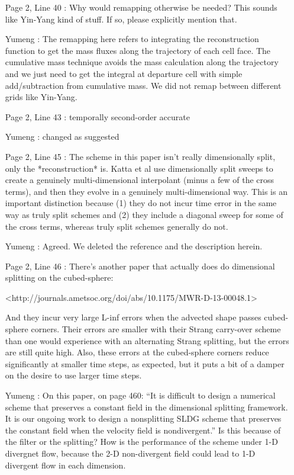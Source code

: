 \documentclass[12pt]{article}
\begin{document}
\begin{enumerate}
\item [Page 2, Line 40]: Why would remapping otherwise be needed? This sounds like Yin-Yang kind of stuff. If so, please explicitly mention that.

\item [Yumeng]:  The remapping here refers to integrating the reconstruction function to get the mass fluxes along the trajectory of each cell face. The cumulative mass technique \citep{CW84,LLM95} avoids the mass calculation along the trajectory and we just need to get the integral at departure cell with simple add/subtraction from cumulative mass. We did not remap between different grids like Yin-Yang.

\item [Page 2, Line 43]: temporally second-order accurate

\item [Yumeng]: changed as suggested

\item [Page 2, Line 45]: The scheme in this paper isn't really dimensionally split, only the *reconstruction* is. Katta et al use dimensionally split sweeps to create a genuinely multi-dimensional interpolant (minus a few of the cross terms), and then they evolve in a genuinely multi-dimensional way. This is an important distinction because (1) they do not incur time error in the same way as truly split schemes and (2) they include a diagonal sweep for some of the cross terms, whereas truly split schemes generally do not.

\item [Yumeng]: Agreed. We deleted the reference and the description herein.


\item [Page 2, Line 46]: There's another paper that actually does do dimensional splitting on the cubed-sphere:

<http://journals.ametsoc.org/doi/abs/10.1175/MWR-D-13-00048.1>

And they incur very large L-inf errors when the advected shape passes cubed-sphere corners. Their errors are smaller with their Strang carry-over scheme than one would experience with an alternating Strang splitting, but the errors are still quite high. Also, these errors at the cubed-sphere corners reduce significantly at smaller time steps, as expected, but it puts a bit of a damper on the desire to use larger time steps.

\item [Yumeng]: 
On this paper, on page 460: 
``It is difficult to design a numerical scheme that preserves a constant field in the dimensional splitting framework. It is our ongoing work to design a nonsplitting SLDG scheme that preserves the constant field when the velocity field is nondivergent.'' 
Is this because of the filter or the splitting? How is the performance of the scheme under 1-D divergnet flow, because the 2-D non-divergent field could lead to 1-D divergent flow in each dimension.


\end{enumerate}
\end{document}
